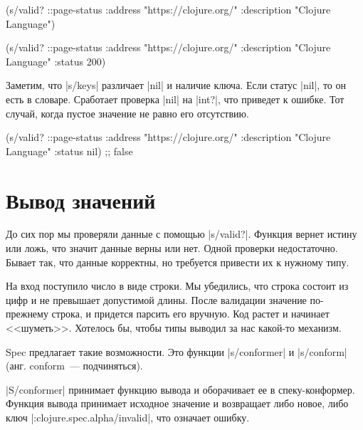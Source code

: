 \begin{english}
  \begin{clojure}
(s/valid? ::page-status
          {:address "https://clojure.org/"
           :description "Clojure Language"})

(s/valid? ::page-status
          {:address "https://clojure.org/"
           :description "Clojure Language"
           :status 200})
  \end{clojure}
\end{english}

Заметим, что \spverb|s/keys| различает \spverb|nil| и наличие ключа. Если статус
\spverb|nil|, то он есть в словаре. Сработает проверка \spverb|nil| на
\spverb|int?|, что приведет к ошибке. Тот случай, когда пустое значение не равно
его отсутствию.

\begin{english}
  \begin{clojure}
(s/valid? ::page-status
          {:address "https://clojure.org/"
           :description "Clojure Language"
           :status nil})
;; false
  \end{clojure}
\end{english}

\section{Вывод значений}

\label{spec-conform}

До сих пор мы проверяли данные с помощью \spverb|s/valid?|. Функция вернет
истину или ложь, что значит данные верны или нет. Одной проверки
недостаточно. Бывает так, что данные корректны, но требуется привести их к
нужному типу.

На вход поступило число в виде строки. Мы убедились, что строка состоит из цифр
и не превышает допустимой длины. После валидации значение по-прежнему строка, и
придется парсить его вручную. Код растет и начинает <<шуметь>>. Хотелось бы,
чтобы типы выводил за нас какой-то механизм.

Spec предлагает такие возможности. Это функции \spverb|s/conformer| и
\spverb|s/conform| (анг. conform~--- подчиняться).

\label{spec-invalid}

\spverb|S/conformer| принимает функцию вывода и оборачивает ее в
спеку-конформер. Функция вывода принимает исходное значение и возвращает либо
новое, либо ключ \spverb|:clojure.spec.alpha/invalid|, что означает ошибку.

